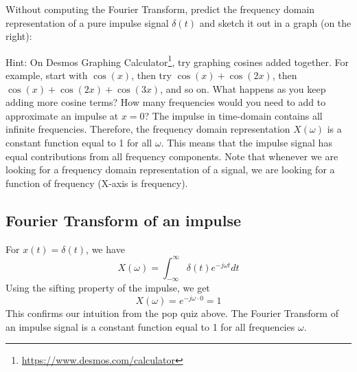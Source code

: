 \documentclass{ee102_notes}
\begin{document}
\begin{popquiz}
  Without computing the Fourier Transform, predict the frequency domain representation of a pure impulse signal $\delta(t)$ and sketch it out in a graph (on the right):
  \begin{center}
  \end{center}

    Hint: On Desmos Graphing Calculator\footnote{\url{https://www.desmos.com/calculator}}, try graphing cosines added together. For example, start with $\cos(x)$, then try $\cos(x) + \cos(2x)$, then $\cos(x) + \cos(2x) + \cos(3x)$, and so on. What happens as you keep adding more cosine terms? How many frequencies would you need to add to approximate an impulse at $x=0$?
\popqsplit 
The impulse in time-domain contains all infinite frequencies. Therefore, the frequency domain representation $X(\omega)$ is a constant function equal to 1 for all $\omega$. This means that the impulse signal has equal contributions from all frequency components. Note that whenever we are looking for a frequency domain representation of a signal, we are looking for a function of frequency (X-axis is frequency).
\end{popquiz}

\subsection{Fourier Transform of an impulse}
For $x(t) = \delta(t)$, we have
\begin{equation*}
    X(\omega) = \int_{-\infty}^{\infty} \delta(t) e^{-j\omega t} dt
\end{equation*}
Using the sifting property of the impulse, we get
\begin{equation*}
    X(\omega) = e^{-j\omega \cdot 0} = 1
\end{equation*}
This confirms our intuition from the pop quiz above. The Fourier Transform of an impulse signal is a constant function equal to 1 for all frequencies $\omega$.
\end{document}
